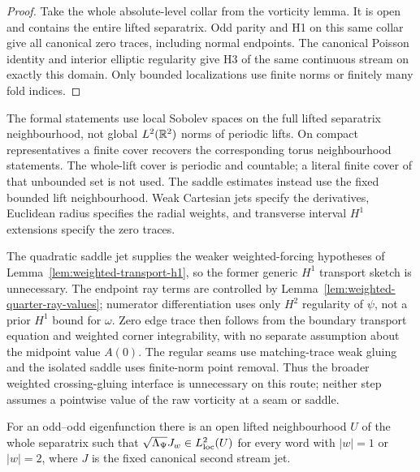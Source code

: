 \begin{proof}
\leanok
Take the whole absolute-level collar from the vorticity lemma.
It is open and contains the entire lifted separatrix.
Odd parity and H1 on this same collar give all canonical zero traces,
including normal endpoints. The canonical Poisson identity and interior
elliptic regularity give H3 of the same continuous stream on exactly this domain.
Only bounded localizations use finite norms or finitely many fold indices.
\end{proof}

\begin{remark}
The formal statements use local Sobolev spaces on the full lifted
separatrix neighbourhood, not global $L^2(\mathbb{R}^2)$ norms of periodic lifts.
On compact representatives a finite cover recovers the corresponding
torus neighbourhood statements. The whole-lift cover is periodic and
countable; a literal finite cover of that unbounded set is not used. The saddle estimates instead use the
fixed bounded lift neighbourhood. Weak Cartesian jets specify the
derivatives, Euclidean radius specifies the radial weights, and transverse
interval $H^1$ extensions specify the zero traces.
\end{remark}

\begin{remark}
The quadratic saddle jet supplies the weaker weighted-forcing hypotheses
of Lemma~\ref{lem:weighted-transport-h1}, so the former generic $H^1$
transport sketch is unnecessary. The endpoint ray terms are controlled by
Lemma~\ref{lem:weighted-quarter-ray-values}; numerator differentiation uses only
$H^2$ regularity of $\psi$, not a prior $H^1$ bound for $\omega$.
Zero edge trace then follows from the boundary transport equation and
weighted corner integrability, with no separate assumption about the
midpoint value $A(0)$. The regular seams use matching-trace weak gluing and
the isolated saddle uses finite-norm point removal. Thus the broader weighted crossing-gluing
interface is unnecessary on this route; neither step assumes a pointwise
value of the raw vorticity at a seam or saddle.
\end{remark}

\begin{lemma}
\label{lem:dd-log-ordinary-bulk}
\leanok
For an odd--odd eigenfunction there is an open lifted neighbourhood $U$ of
the whole separatrix such that
$\sqrt{\Lambda_\Psi}J_w\in L^2_{\rm loc}(U)$ for every word with
$|w|=1$ or $|w|=2$, where $J$ is the fixed canonical second stream jet.
\end{lemma}

